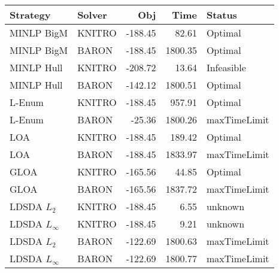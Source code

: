 \begin{tabular}{llrrl}
\toprule
Strategy & Solver & Obj & Time & Status \\
\midrule
MINLP BigM & KNITRO & -188.45 & 82.61 & Optimal \\
MINLP BigM & BARON & -188.45 & 1800.35 & Optimal \\
MINLP Hull & KNITRO & -208.72 & 13.64 & Infeasible \\
MINLP Hull & BARON & -142.12 & 1800.51 & Optimal \\
L-Enum & KNITRO & -188.45 & 957.91 & Optimal \\
L-Enum & BARON & -25.36 & 1800.26 & maxTimeLimit \\
LOA & KNITRO & -188.45 & 189.42 & Optimal \\
LOA & BARON & -188.45 & 1833.97 & maxTimeLimit \\
GLOA & KNITRO & -165.56 & 44.85 & Optimal \\
GLOA & BARON & -165.56 & 1837.72 & maxTimeLimit \\
LDSDA $L_2$ & KNITRO & -188.45 & 6.55 & unknown \\
LDSDA $L_\infty$ & KNITRO & -188.45 & 9.21 & unknown \\
LDSDA $L_2$ & BARON & -122.69 & 1800.63 & maxTimeLimit \\
LDSDA $L_\infty$ & BARON & -122.69 & 1800.77 & maxTimeLimit \\
\bottomrule
\end{tabular}
